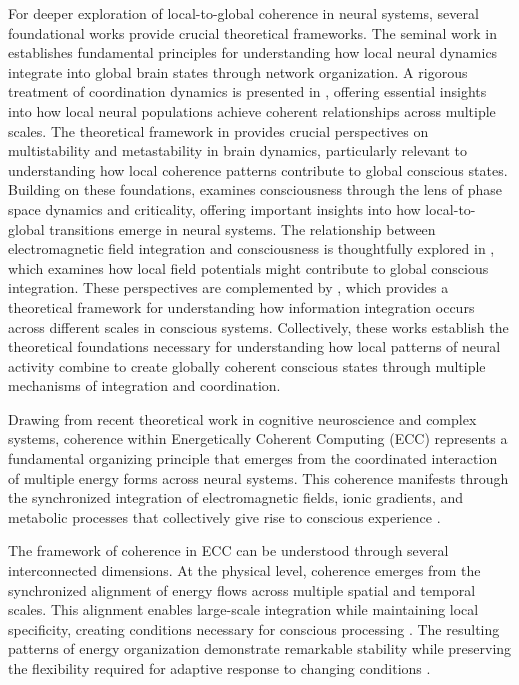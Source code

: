 \begin{refsection}
For deeper exploration of local-to-global coherence in neural systems, several foundational works provide crucial theoretical frameworks. The seminal work in \cite{Sporns2011} establishes fundamental principles for understanding how local neural dynamics integrate into global brain states through network organization. A rigorous treatment of coordination dynamics is presented in \cite{Bressler2016}, offering essential insights into how local neural populations achieve coherent relationships across multiple scales. The theoretical framework in \cite{Kelso2012} provides crucial perspectives on multistability and metastability in brain dynamics, particularly relevant to understanding how local coherence patterns contribute to global conscious states. Building on these foundations, \cite{Werner2013} examines consciousness through the lens of phase space dynamics and criticality, offering important insights into how local-to-global transitions emerge in neural systems. The relationship between electromagnetic field integration and consciousness is thoughtfully explored in \cite{McFadden2020}, which examines how local field potentials might contribute to global conscious integration. These perspectives are complemented by \cite{Tononi2015}, which provides a theoretical framework for understanding how information integration occurs across different scales in conscious systems. Collectively, these works establish the theoretical foundations necessary for understanding how local patterns of neural activity combine to create globally coherent conscious states through multiple mechanisms of integration and coordination.

Drawing from recent theoretical work in cognitive neuroscience and complex systems, coherence within Energetically Coherent Computing (ECC) represents a fundamental organizing principle that emerges from the coordinated interaction of multiple energy forms across neural systems. This coherence manifests through the synchronized integration of electromagnetic fields, ionic gradients, and metabolic processes that collectively give rise to conscious experience \cite{McFadden2020, Werner2013}.

The framework of coherence in ECC can be understood through several interconnected dimensions. At the physical level, coherence emerges from the synchronized alignment of energy flows across multiple spatial and temporal scales. This alignment enables large-scale integration while maintaining local specificity, creating conditions necessary for conscious processing \cite{Kelso2012}. The resulting patterns of energy organization demonstrate remarkable stability while preserving the flexibility required for adaptive response to changing conditions \cite{Freeman2007}.


\end{refsection}
